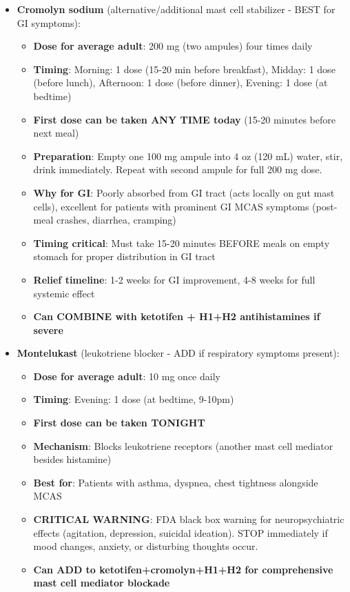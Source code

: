\begin{enumerate}
\begin{itemize}
        \item \textbf{Cromolyn sodium} (alternative/additional mast cell stabilizer - BEST for GI symptoms):
        \begin{itemize}
            \item \textbf{Dose for average adult}: 200 mg (two ampules) four times daily
            \item \textbf{Timing}: Morning: 1 dose (15-20 min before breakfast), Midday: 1 dose (before lunch), Afternoon: 1 dose (before dinner), Evening: 1 dose (at bedtime)
            \item \textbf{First dose can be taken ANY TIME today} (15-20 minutes before next meal)
            \item \textbf{Preparation}: Empty one 100 mg ampule into 4 oz (120 mL) water, stir, drink immediately. Repeat with second ampule for full 200 mg dose.
            \item \textbf{Why for GI}: Poorly absorbed from GI tract (acts locally on gut mast cells), excellent for patients with prominent GI MCAS symptoms (post-meal crashes, diarrhea, cramping)
            \item \textbf{Timing critical}: Must take 15-20 minutes BEFORE meals on empty stomach for proper distribution in GI tract
            \item \textbf{Relief timeline}: 1-2 weeks for GI improvement, 4-8 weeks for full systemic effect
            \item \textbf{Can COMBINE with ketotifen + H1+H2 antihistamines if severe}
        \end{itemize}

        \item \textbf{Montelukast} (leukotriene blocker - ADD if respiratory symptoms present):
        \begin{itemize}
            \item \textbf{Dose for average adult}: 10 mg once daily
            \item \textbf{Timing}: Evening: 1 dose (at bedtime, 9-10pm)
            \item \textbf{First dose can be taken TONIGHT}
            \item \textbf{Mechanism}: Blocks leukotriene receptors (another mast cell mediator besides histamine)
            \item \textbf{Best for}: Patients with asthma, dyspnea, chest tightness alongside MCAS
            \item \textbf{CRITICAL WARNING}: FDA black box warning for neuropsychiatric effects (agitation, depression, suicidal ideation). STOP immediately if mood changes, anxiety, or disturbing thoughts occur.
            \item \textbf{Can ADD to ketotifen+cromolyn+H1+H2 for comprehensive mast cell mediator blockade}
        \end{itemize}
    \end{itemize}


\end{enumerate}
